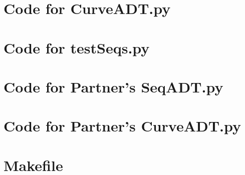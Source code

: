 \documentclass[12pt]{article}
\begin{document}
\noindent 

\newpage

\section{Code for CurveADT.py}

\noindent 

\newpage

\section{Code for testSeqs.py}

\noindent 

\newpage

\section{Code for Partner's SeqADT.py}

\noindent 

\newpage

\section{Code for Partner's CurveADT.py}

\noindent 

\newpage

\section{Makefile}

\lstset{language=make}
\noindent 
\end{document}
